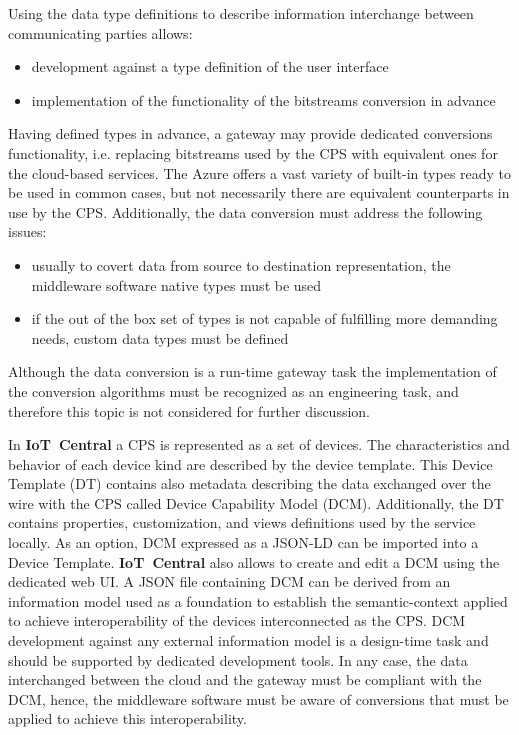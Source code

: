 \documentclass[runningheads]{llncs}
\begin{document}
Using the data type definitions to describe information interchange between communicating parties allows:

\begin{itemize}
      \item development against a type definition of the user interface
      \item implementation of the functionality of the bitstreams conversion in advance
\end{itemize}

Having defined types in advance, a gateway may provide dedicated conversions functionality, i.e. replacing bitstreams used by the CPS with equivalent ones for the cloud-based services. The Azure offers a vast variety of built-in types ready to be used in common cases, but not necessarily there are equivalent counterparts in use by the CPS. Additionally, the data conversion must address the following issues:

\begin{itemize}
      \item usually to covert data from source to destination representation, the middleware software native types must be used
      \item if the out of the box set of types is not capable of fulfilling more demanding needs, custom data types must be defined
\end{itemize}

Although the data conversion is a run-time gateway task the implementation of the conversion algorithms must be recognized as an engineering task, and therefore this topic is not considered for further discussion.

In \textbf{IoT\ Central} a CPS is represented as a set of devices. The characteristics and behavior of each device kind are described by the device template. This Device Template (DT) contains also metadata describing the data exchanged over the wire with the CPS called Device Capability Model (DCM). Additionally, the DT contains properties, customization, and views definitions used by the service locally. As an option, DCM expressed as a JSON-LD can be imported into a Device Template. \textbf{IoT\ Central} also allows to create and edit a DCM using the dedicated web UI. A JSON file containing DCM can be derived from an information model used as a foundation to establish the semantic-context applied to achieve interoperability of the devices interconnected as the CPS. DCM development against any external information model is a design-time task and should be supported by dedicated development tools. In any case, the data interchanged between the cloud and the gateway must be compliant with the DCM, hence, the middleware software must be aware of conversions that must be applied to achieve this interoperability.
\end{document}
